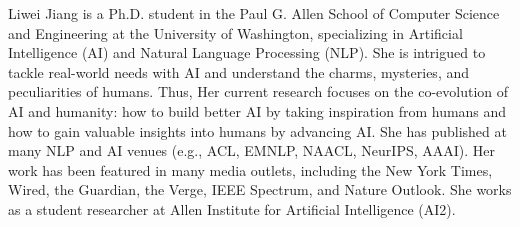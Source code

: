 Liwei Jiang is a Ph.D. student in the Paul G. Allen School of Computer Science and Engineering at the University of Washington, specializing in Artificial Intelligence (AI) and Natural Language Processing (NLP). She is intrigued to tackle real-world needs with AI and understand the charms, mysteries, and peculiarities of humans. Thus, Her current research focuses on the co-evolution of AI and humanity: how to build better AI by taking inspiration from humans and how to gain valuable insights into humans by advancing AI. She has published at many NLP and AI venues (e.g., ACL, EMNLP, NAACL, NeurIPS, AAAI). Her work has been featured in many media outlets, including the New York Times, Wired, the Guardian, the Verge, IEEE Spectrum, and Nature Outlook. She works as a student researcher at Allen Institute for Artificial Intelligence (AI2).